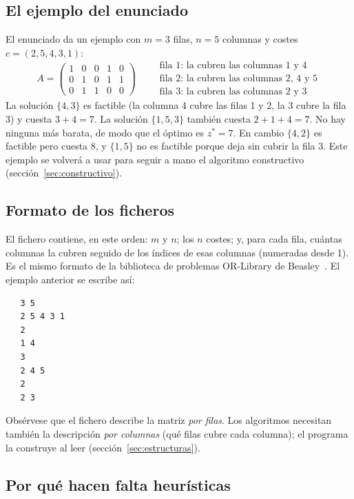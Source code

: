 \subsection{El ejemplo del enunciado}\label{sec:ejemplo}

El enunciado da un ejemplo con $m=3$ filas, $n=5$ columnas y costes $c=(2,5,4,3,1)$:
\[
A=\begin{pmatrix}
1&0&0&1&0\\
0&1&0&1&1\\
0&1&1&0&0
\end{pmatrix}
\qquad
\begin{array}{l}
\text{fila 1: la cubren las columnas 1 y 4}\\
\text{fila 2: la cubren las columnas 2, 4 y 5}\\
\text{fila 3: la cubren las columnas 2 y 3}
\end{array}
\]
La solución $\{4,3\}$ es factible (la columna 4 cubre las filas 1 y 2, la 3 cubre la fila 3)
y cuesta $3+4=7$. La solución $\{1,5,3\}$ también cuesta $2+1+4=7$. No hay ninguna más
barata, de modo que el óptimo es $z^\ast=7$. En cambio $\{4,2\}$ es factible pero cuesta 8, y
$\{1,5\}$ no es factible porque deja sin cubrir la fila 3. Este ejemplo se volverá a usar
para seguir a mano el algoritmo constructivo (sección~\ref{sec:constructivo}).

\subsection{Formato de los ficheros}

El fichero  contiene, en este orden: $m$ y $n$; los $n$ costes; y, para cada
fila, cuántas columnas la cubren seguido de los índices de esas columnas (numeradas desde 1).
Es el mismo formato de la biblioteca de problemas OR-Library de
Beasley~\cite{orlib}. El ejemplo anterior se escribe así:
\begin{verbatim}
   3 5
   2 5 4 3 1
   2
   1 4
   3
   2 4 5
   2
   2 3
\end{verbatim}
Obsérvese que el fichero describe la matriz \emph{por filas}. Los algoritmos necesitan
también la descripción \emph{por columnas} (qué filas cubre cada columna); el programa la
construye al leer (sección~\ref{sec:estructuras}).

\subsection{Por qué hacen falta heurísticas}

